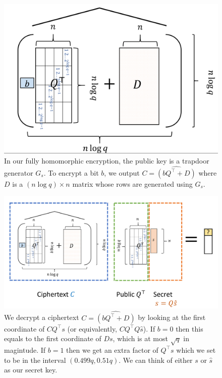 \begin{figure}
\centering
\includegraphics[width=\textwidth, height=0.25\paperheight, keepaspectratio]{../figure/fheenc.png}
\caption{In our fully homomorphic encryption, the public key is a
trapdoor generator \(G_s\). To encrypt a bit \(b\), we output
\(C=\widehat{(bQ^\top +D)}\) where \(D\) is a \((n\log q) \times n\)
matrix whose rows are generated using \(G_s\).}
\label{fheencfig}
\end{figure}

\begin{figure}
\centering
\includegraphics[width=\textwidth, height=0.25\paperheight, keepaspectratio]{../figure/fhedec.png}
\caption{We decrypt a ciphertext \(C=\widehat{(bQ^\top +D)}\) by looking
at the first coordinate of \(\ensuremath{\mathit{CQ}}^\top s\) (or
equivalently, \(\ensuremath{\mathit{CQ}}^\top Q\hat{s}\)). If \(b=0\)
then this equals to the first coordinate of \(Ds\), which is at most
\(\sqrt{q}\) in magintude. If \(b=1\) then we get an extra factor of
\(Q^\top s\) which we set to be in the interval \((0.499q,0.51q)\). We
can think of either \(s\) or \(\hat{s}\) as our secret key.}
\label{fhedecfig}
\end{figure}


